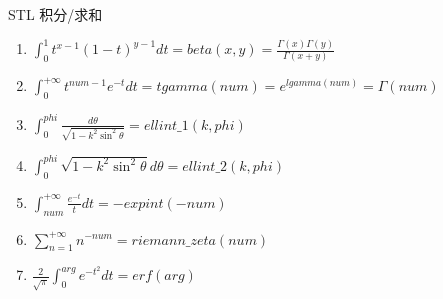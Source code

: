 STL 积分/求和
\begin{enumerate}
\item $\int_{0}^{1} t^{x-1}(1-t)^{y-1}dt = beta(x, y) = \frac{\Gamma(x)\Gamma(y)}{\Gamma(x + y)}$
\item $\int_{0}^{+\infty} t^{num-1}e^{-t}dt = tgamma(num) = e^{lgamma(num)} = \Gamma(num)$
\item $\int_{0}^{phi} \frac{d\theta}{\sqrt{1-k^2\sin^2 \theta}} = ellint\_1(k, phi)$
\item $\int_{0}^{phi} \sqrt{1-k^2\sin^2 \theta} d\theta = ellint\_2(k, phi)$
\item $\int_{num}^{+\infty} \frac{e^{-t}}{t} dt = -expint(-num)$
\item $\sum_{n=1}^{+\infty} n^{-num} = riemann\_zeta(num)$
\item $\frac{2}{\sqrt{\pi}} \int_{0}^{arg} e^{-t^2} dt = erf(arg)$
\end{enumerate}